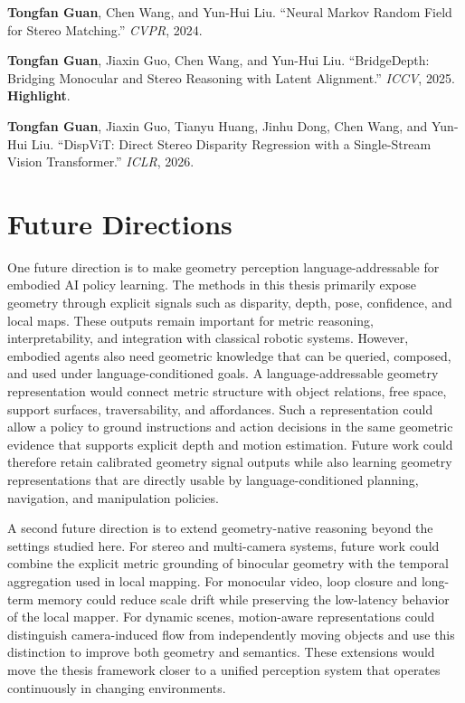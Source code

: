 \noindent \textbf{Tongfan Guan}, Chen Wang, and Yun-Hui Liu. ``Neural Markov Random Field for Stereo Matching.'' \emph{CVPR}, 2024.

\noindent \textbf{Tongfan Guan}, Jiaxin Guo, Chen Wang, and Yun-Hui Liu. ``BridgeDepth: Bridging Monocular and Stereo Reasoning with Latent Alignment.'' \emph{ICCV}, 2025. \textbf{Highlight}.

\noindent \textbf{Tongfan Guan}, Jiaxin Guo, Tianyu Huang, Jinhu Dong, Chen Wang, and Yun-Hui Liu. ``DispViT: Direct Stereo Disparity Regression with a Single-Stream Vision Transformer.'' \emph{ICLR}, 2026.

\section{Future Directions}

One future direction is to make geometry perception language-addressable for embodied AI policy learning.
The methods in this thesis primarily expose geometry through explicit signals such as disparity, depth, pose, confidence, and local maps.
These outputs remain important for metric reasoning, interpretability, and integration with classical robotic systems.
However, embodied agents also need geometric knowledge that can be queried, composed, and used under language-conditioned goals.
A language-addressable geometry representation would connect metric structure with object relations, free space, support surfaces, traversability, and affordances.
Such a representation could allow a policy to ground instructions and action decisions in the same geometric evidence that supports explicit depth and motion estimation.
Future work could therefore retain calibrated geometry signal outputs while also learning geometry representations that are directly usable by language-conditioned planning, navigation, and manipulation policies.

A second future direction is to extend geometry-native reasoning beyond the settings studied here.
For stereo and multi-camera systems, future work could combine the explicit metric grounding of binocular geometry with the temporal aggregation used in local mapping.
For monocular video, loop closure and long-term memory could reduce scale drift while preserving the low-latency behavior of the local mapper.
For dynamic scenes, motion-aware representations could distinguish camera-induced flow from independently moving objects and use this distinction to improve both geometry and semantics.
These extensions would move the thesis framework closer to a unified perception system that operates continuously in changing environments.

